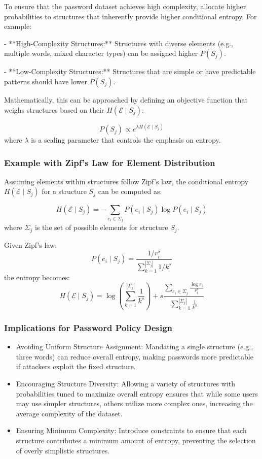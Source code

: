 To ensure that the password dataset achieves high complexity, allocate higher probabilities to structures that inherently provide higher conditional entropy. For example:

- **High-Complexity Structures:** Structures with diverse elements (e.g., multiple words, mixed character types) can be assigned higher \( P(S_j) \).
  
- **Low-Complexity Structures:** Structures that are simple or have predictable patterns should have lower \( P(S_j) \).

Mathematically, this can be approached by defining an objective function that weighs structures based on their \( H(\mathcal{E} \mid S_j) \):

\[
P(S_j) \propto e^{\lambda H(\mathcal{E} \mid S_j)}
\]
where \( \lambda \) is a scaling parameter that controls the emphasis on entropy.

\subsubsection{Example with Zipf’s Law for Element Distribution}

Assuming elements within structures follow Zipf’s law, the conditional entropy \( H(\mathcal{E} \mid S_j) \) for a structure \( S_j \) can be computed as:

\[
H(\mathcal{E} \mid S_j) = - \sum_{e_i \in \Sigma_j} P(e_i \mid S_j) \log P(e_i \mid S_j)
\]
where \( \Sigma_j \) is the set of possible elements for structure \( S_j \).

Given Zipf’s law:
\[
P(e_i \mid S_j) = \frac{1 / r_i^s}{\sum_{k=1}^{|\Sigma_j|} 1 / k^s}
\]
the entropy becomes:
\[
H(\mathcal{E} \mid S_j) = \log \left( \sum_{k=1}^{|\Sigma_j|} \frac{1}{k^s} \right) + s \frac{\sum_{e_i \in \Sigma_j} \frac{\log r_i}{r_i^s}}{\sum_{k=1}^{|\Sigma_j|} \frac{1}{k^s}}
\]

\subsubsection{Implications for Password Policy Design}

\begin{itemize}
\item Avoiding Uniform Structure Assignment: Mandating a single structure (e.g., three words) can reduce overall entropy, making passwords more predictable if attackers exploit the fixed structure.
\item Encouraging Structure Diversity: Allowing a variety of structures with probabilities tuned to maximize overall entropy ensures that while some users may use simpler structures, others utilize more complex ones, increasing the average complexity of the dataset.
\item Ensuring Minimum Complexity: Introduce constraints to ensure that each structure contributes a minimum amount of entropy, preventing the selection of overly simplistic structures.
\end{itemize}


